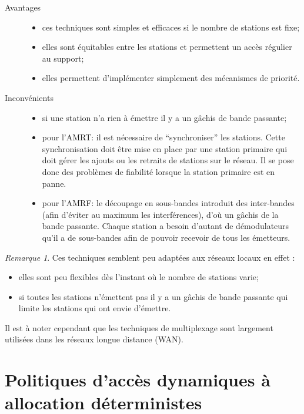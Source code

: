 \documentclass[11pt,english,french]{scrreprt}
\theoremstyle{remark}
\newtheorem*{rem*}{Remarque}
\theoremstyle{definition}
\begin{document}
\begin{description}
	\item [Avantages] \hfill
	\begin{itemize}
			\item ces techniques sont simples et efficaces si le nombre de stations est fixe;
			\item elles sont équitables entre les stations et permettent un accès régulier au support;
			\item elles permettent d'implémenter simplement des mécanismes de priorité.
	\end{itemize}
	\item[Inconvénients] \hfill
	\begin{itemize}
		\item si une station n'a rien à émettre il y a un gâchis de bande passante;
		\item pour l'AMRT: il est nécessaire de “synchroniser” les stations. Cette synchronisation doit être mise en place par une station primaire qui doit gérer les ajouts ou les retraits de stations sur le réseau. Il se pose donc des problèmes de fiabilité lorsque la station primaire est en panne.
		\item pour l'AMRF: le découpage en sous-bandes introduit des inter-bandes (afin d'éviter au maximum les interférences), d'où un gâchis de la bande passante. Chaque station a besoin d'autant de démodulateurs qu'il  a de sous-bandes afin de pouvoir recevoir de tous les émetteurs.
	\end{itemize}
\end{description}



\begin{rem*}
	Ces techniques semblent peu adaptées aux réseaux locaux en effet :
	\begin{itemize}
		\item elles sont peu flexibles dès l'instant où le nombre de stations varie;
		\item si toutes les stations n'émettent pas il y a un gâchis de bande passante qui limite les stations qui ont envie d'émettre.
	\end{itemize}
	
	Il est à noter cependant que les techniques de multiplexage sont largement utilisées dans les réseaux longue distance (WAN).
\end{rem*}

\section{Politiques d'accès dynamiques à allocation déterministes} %
\end{document}
